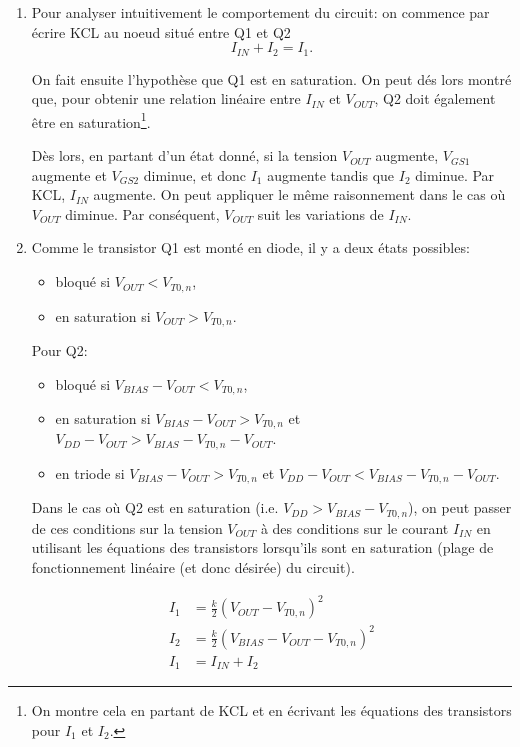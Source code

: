 \begin{enumerate}
	\item Pour analyser intuitivement le comportement du circuit: on commence par écrire KCL
	au noeud situé entre Q1 et Q2
	\[ I_{IN} + I_2 = I_1. \]
	
	On fait ensuite l'hypothèse que Q1 est en saturation. On peut dés lors montré que, pour
	obtenir une relation linéaire entre $I_{IN}$ et $V_{OUT}$, Q2 doit également être en
	saturation\footnote{On montre cela en partant de KCL et en écrivant les équations
	des transistors pour $I_1$ et $I_2$.}.
	
	Dès lors, en partant d'un état donné, si la tension
	$V_{OUT}$ augmente, $V_{GS1}$ augmente et $V_{GS2}$ diminue, et donc $I_1$ augmente tandis
	que $I_2$ diminue. Par KCL, $I_{IN}$ augmente.
	On peut appliquer le même raisonnement dans le cas où $V_{OUT}$ diminue. Par conséquent,
	$V_{OUT}$ suit les variations de $I_{IN}$.
	
	\item Comme le transistor Q1 est monté en diode, il y a deux états possibles:
	\begin{itemize}
		\item bloqué si $V_{OUT} < V_{T0,n}$,
		\item en saturation si $V_{OUT} > V_{T0,n}$.
	\end{itemize}

	Pour Q2:
	\begin{itemize}
		\item bloqué si $V_{BIAS} - V_{OUT} < V_{T0,n}$,
		\item en saturation si $V_{BIAS} - V_{OUT} > V_{T0,n}$ et $V_{DD} - V_{OUT} > V_{BIAS} -
        V_{T0,n} - V_{OUT}$.
       	\item en triode si $V_{BIAS} - V_{OUT} > V_{T0,n}$ et $V_{DD} - V_{OUT} < V_{BIAS} - V_{T0,n} - V_{OUT}$.
	\end{itemize}

	Dans le cas où Q2 est en saturation (i.e. $V_{DD} > V_{BIAS} - V_{T0,n}$), on peut passer de ces conditions
	sur la tension $V_{OUT}$ à des conditions sur le courant $I_{IN}$ en utilisant les équations des transistors
	lorsqu'ils sont en saturation (plage de fonctionnement linéaire (et donc désirée) du circuit).

	\begin{align*}
    	I_1 &= \frac{k}{2}\left(V_{OUT} - V_{T0,n}\right)^2 \\
    	I_2 &= \frac{k}{2}\left(V_{BIAS} - V_{OUT} - V_{T0,n}\right)^2 \\
    	I_{1} &= I_{IN} + I_{2}
	\end{align*}
    

\end{enumerate}

